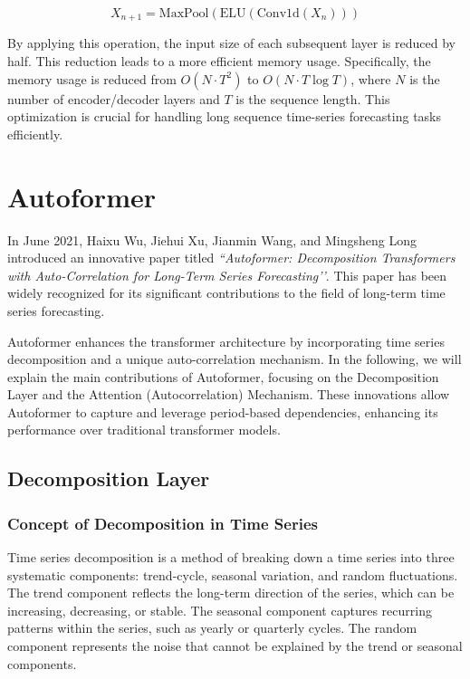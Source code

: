 \begin{equation}
X_{n+1} = \text{MaxPool}(\text{ELU}(\text{Conv1d}(X_n)))
\end{equation}

By applying this operation, the input size of each subsequent layer is reduced by half. This reduction leads to a more efficient memory usage. Specifically, the memory usage is reduced from \( O(N \cdot T^2) \) to \( O(N \cdot T \log T) \), where \( N \) is the number of encoder/decoder layers and \( T \) is the sequence length. This optimization is crucial for handling long sequence time-series forecasting tasks efficiently.



\section{Autoformer}
In June 2021, Haixu Wu, Jiehui Xu, Jianmin Wang, and Mingsheng Long introduced an innovative paper titled \textit{``Autoformer: Decomposition Transformers with Auto-Correlation for Long-Term Series Forecasting’'}. This paper has been widely recognized for its significant contributions to the field of long-term time series forecasting.

Autoformer enhances the transformer architecture by incorporating time series decomposition and a unique auto-correlation mechanism. In the following, we will explain the main contributions of Autoformer, focusing on the Decomposition Layer and the Attention (Autocorrelation) Mechanism. These innovations allow Autoformer to capture and leverage period-based dependencies, enhancing its performance over traditional transformer models.

\subsection{Decomposition Layer}
\subsubsection{Concept of Decomposition in Time Series}
Time series decomposition is a method of breaking down a time series into three systematic components: trend-cycle, seasonal variation, and random fluctuations. The trend component reflects the long-term direction of the series, which can be increasing, decreasing, or stable. The seasonal component captures recurring patterns within the series, such as yearly or quarterly cycles. The random component represents the noise that cannot be explained by the trend or seasonal components.

